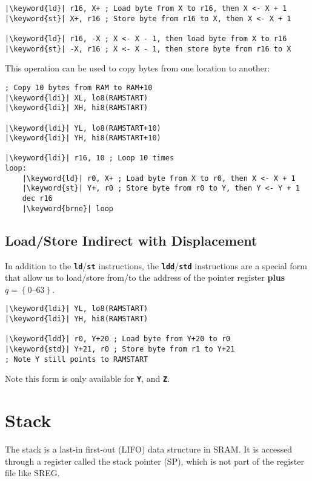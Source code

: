 \documentclass{report}
\newcommand{\keyword}[1]{\textcolor[rgb]{0.00,0.50,0.00}{\textbf{#1}}}
\newcommand{\keywordinline}[1]{\textcolor[rgb]{0.00,0.50,0.00}{\textbf{\texttt{#1}}}}
\begin{document}
\begin{verbatim}
|\keyword{ld}| r16, X+ ; Load byte from X to r16, then X <- X + 1
|\keyword{st}| X+, r16 ; Store byte from r16 to X, then X <- X + 1

|\keyword{ld}| r16, -X ; X <- X - 1, then load byte from X to r16
|\keyword{st}| -X, r16 ; X <- X - 1, then store byte from r16 to X
\end{verbatim}
This operation can be used to copy bytes from one location to another:
\begin{verbatim}
; Copy 10 bytes from RAM to RAM+10
|\keyword{ldi}| XL, lo8(RAMSTART)
|\keyword{ldi}| XH, hi8(RAMSTART)

|\keyword{ldi}| YL, lo8(RAMSTART+10)
|\keyword{ldi}| YH, hi8(RAMSTART+10)

|\keyword{ldi}| r16, 10 ; Loop 10 times
loop:
    |\keyword{ld}| r0, X+ ; Load byte from X to r0, then X <- X + 1
    |\keyword{st}| Y+, r0 ; Store byte from r0 to Y, then Y <- Y + 1
    dec r16
    |\keyword{brne}| loop
\end{verbatim}
\subsection{Load/Store Indirect with Displacement}
In addition to the \keywordinline{ld}/\keywordinline{st} instructions,
the \keywordinline{ldd}/\keywordinline{std} instructions are a special
form that allow us to load/store from/to the address of the pointer
register \textbf{plus} \(q = \left\{ \numrange{0}{63} \right\}\).
\begin{verbatim}
|\keyword{ldi}| YL, lo8(RAMSTART)
|\keyword{ldi}| YH, hi8(RAMSTART)

|\keyword{ldd}| r0, Y+20 ; Load byte from Y+20 to r0
|\keyword{std}| Y+21, r0 ; Store byte from r1 to Y+21
; Note Y still points to RAMSTART
\end{verbatim}
Note this form is only available for \keywordinline{Y}, and
\keywordinline{Z}.
\section{Stack}
The stack is a last-in first-out (LIFO) data structure in SRAM\@. It is
accessed through a register called the stack pointer (SP), which is not
part of the register file like SREG\@.
\end{document}
